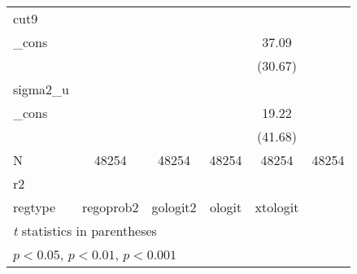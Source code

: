 {\begin{tabular}{l*{5}{c}}
\hline
cut9        &                     &                     &                     &                     &                     \\
\_cons      &                     &                     &                     &       37.09\sym{***}&                     \\
            &                     &                     &                     &     (30.67)         &                     \\
\hline
sigma2\_u    &                     &                     &                     &                     &                     \\
\_cons      &                     &                     &                     &       19.22\sym{***}&                     \\
            &                     &                     &                     &     (41.68)         &                     \\
\hline
N           &       48254         &       48254         &       48254         &       48254         &       48254         \\
r2          &                     &                     &                     &                     &                     \\
regtype     &   regoprob2         &    gologit2         &      ologit         &    xtologit         &                     \\
\hline\hline
\multicolumn{6}{l}{\footnotesize \textit{t} statistics in parentheses}\\
\multicolumn{6}{l}{\footnotesize \sym{*} \(p<0.05\), \sym{**} \(p<0.01\), \sym{***} \(p<0.001\)}\\
\end{tabular}
}
